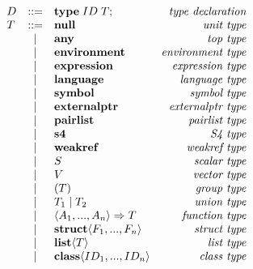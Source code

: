 \documentclass[acmsmall,review,anonymous]{acmart}\settopmatter{printfolios=true,printccs=false,printacmref=false}
\begin{document}
\begin{figure}          %
    \noindent           %
    \centering
    \begin{minipage}{.45\linewidth}
    \begin{flushleft}
      $ \begin{array}{lclr}
    D & ::= & {\bf type} \; ID \; T {\bf ;}  & \text{\it type declaration}\\
    T & ::= & {\bf null} & \text{\it unit type} \\
      & |   & {\bf any} & \text{\it top type} \\
      & |   & {\bf environment} & \text{\it environment type} \\
      & |   & {\bf expression} & \text{\it expression type} \\
      & |   & {\bf language} & \text{\it language type} \\
      & |   & {\bf symbol} & \text{\it symbol type} \\
      & |   & {\bf externalptr} & \text{\it externalptr type} \\
      & |   & {\bf pairlist} & \text{\it pairlist type} \\
      & |   & {\bf s4} & \text{\it S4 type} \\
      & |   & {\bf weakref} & \text{\it weakref type} \\
      & |   & S & \text{\it scalar type} \\
      & |   & V & \text{\it vector type} \\
      & |   & \left( T \right) & \text{\it group type} \\
      & |   & T_1 \; {\bf |} \; T_2 & \text{\it union type} \\
      & |   & \langle A_1 , ..., A_n\rangle \Rightarrow T & \text{\it function type} \\
      & |   & {\bf struct}\langle F_1, ..., F_n \rangle & \text{\it struct type} \\
      & |   & {\bf list} \langle T \rangle & \text{\it list type}\\
      & |   & {\bf class}\langle ID_1, ..., ID_n \rangle & \text{\it class type}\vspace{5pt}\\
    \end{array} $
    \end{flushleft}
    \end{minipage}
    \hfill
    \begin{minipage}{.45\linewidth}

\end{minipage}
\end{figure}
\end{document}
